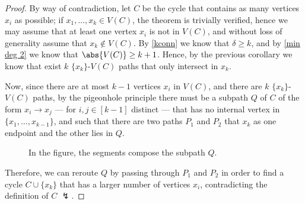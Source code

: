 \documentclass[a4paper, 12pt]{report}
\begin{document}
    \begin{proof}
        By way of contradiction, let $C$ be the cycle that contains as many vertices $x_i$ as possible; if $x_1, \ldots, x_k \in V(C)$, the theorem is trivially verified, hence we may assume that at least one vertex $x_i$ is not in $V(C)$, and without loss of generality assume that $x_k \notin V(C)$. By \cref{kconn} we know that $\delta \ge k$, and by \cref{min deg 2} we know that $\abs{V(C)} \ge k + 1$. Hence, by the previous corollary we know that exist $k$ $\{x_k\}$-$V(C)$ paths that only intersect in $x_k$.

        Now, since there are at most $k - 1$ vertices $x_i$ in $V(C)$, and there are $k$ $\{x_k\}$-$V(C)$ paths, by the pigeonhole principle there must be a subpath $Q$ of $C$ of the form $x_i \to x_j$ --- for $i, j \in [k - 1]$ distinct --- that has no internal vertex in $\{x_1, \ldots, x_{k - 1}\}$, and such that there are two paths $P_1$ and $P_2$ that $x_k$ as one endpoint and the other lies in $Q$.

        \begin{figure}[H]
            \centering
            \caption{In the figure, the  segments compose the subpath $Q$.}
        \end{figure}

        Therefore, we can reroute $Q$ by passing through $P_1$ and $P_2$ in order to find a cycle $C \cup \{x_k\}$ that has a larger number of vertices $x_i$, contradicting the definition of $C$ $\lightning$.
    \end{proof}
\end{document}
